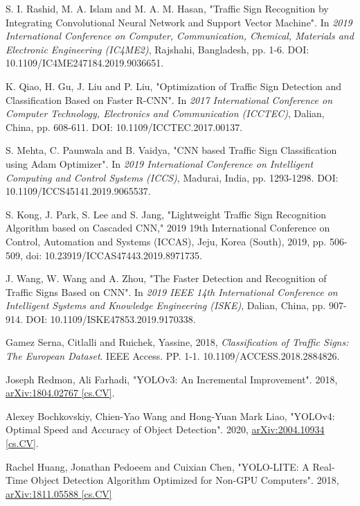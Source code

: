 \documentclass[10pt,twocolumn,letterpaper]{article}
\begin{document}
\begin{thebibliography}{9}
		S. I. Rashid, M. A. Islam and M. A. M. Hasan, "Traffic Sign Recognition by Integrating Convolutional Neural Network and Support Vector Machine". In  \textit{2019 International Conference on Computer, Communication, Chemical, Materials and Electronic Engineering (IC4ME2)}, Rajshahi, Bangladesh, pp. 1-6. DOI: 10.1109/IC4ME247184.2019.9036651.
	
		K. Qiao, H. Gu, J. Liu and P. Liu, "Optimization of Traffic Sign Detection and Classification Based on Faster R-CNN". In \textit{2017 International Conference on Computer Technology, Electronics and Communication (ICCTEC)}, Dalian, China, pp. 608-611. DOI: 10.1109/ICCTEC.2017.00137.
		
		S. Mehta, C. Paunwala and B. Vaidya, "CNN based Traffic Sign Classification using Adam Optimizer". In \textit{2019 International Conference on Intelligent Computing and Control Systems (ICCS)}, Madurai, India, pp. 1293-1298. DOI: 10.1109/ICCS45141.2019.9065537.
		
	S. Kong, J. Park, S. Lee and S. Jang, "Lightweight Traffic Sign Recognition Algorithm based on Cascaded CNN," 2019 19th International Conference on Control, Automation and Systems (ICCAS), Jeju, Korea (South), 2019, pp. 506-509, doi: 10.23919/ICCAS47443.2019.8971735.
	
		J. Wang, W. Wang and A. Zhou, "The Faster Detection and Recognition of Traffic Signs Based on CNN". In \textit{2019 IEEE 14th International Conference on Intelligent Systems and Knowledge Engineering (ISKE)}, Dalian, China, pp. 907-914. DOI: 10.1109/ISKE47853.2019.9170338.
		
		Gamez Serna, Citlalli and Ruichek, Yassine, 2018, \textit{Classification of Traffic Signs: The European Dataset}. IEEE Access. PP. 1-1. 10.1109/ACCESS.2018.2884826. 
		
		Joseph Redmon, Ali Farhadi, "YOLOv3: An Incremental Improvement". 2018, \href{https://arxiv.org/abs/1804.02767}{arXiv:1804.02767 [cs.CV]}.
		
		Alexey Bochkovskiy, Chien-Yao Wang and Hong-Yuan Mark Liao, "YOLOv4: Optimal Speed and Accuracy of Object Detection". 2020, \href{https://arxiv.org/abs/2004.10934}{arXiv:2004.10934 [cs.CV]}.
		
		Rachel Huang, Jonathan Pedoeem and Cuixian Chen, "YOLO-LITE: A Real-Time Object Detection Algorithm Optimized for Non-GPU Computers". 2018, \href{https://arxiv.org/abs/1811.05588}{arXiv:1811.05588 [cs.CV]}
	
\end{thebibliography}


{\small


}
\end{document}

